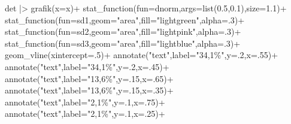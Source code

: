 \documentclass[
  letterpaper,
  DIV=11,
  numbers=noendperiod]{scrartcl}
\newenvironment{Shaded}{\begin{snugshade}}{\end{snugshade}}
\newcommand{\AttributeTok}[1]{\textcolor[rgb]{0.40,0.45,0.13}{#1}}
\newcommand{\DecValTok}[1]{\textcolor[rgb]{0.68,0.00,0.00}{#1}}
\newcommand{\FloatTok}[1]{\textcolor[rgb]{0.68,0.00,0.00}{#1}}
\newcommand{\FunctionTok}[1]{\textcolor[rgb]{0.28,0.35,0.67}{#1}}
\newcommand{\NormalTok}[1]{\textcolor[rgb]{0.00,0.23,0.31}{#1}}
\newcommand{\SpecialCharTok}[1]{\textcolor[rgb]{0.37,0.37,0.37}{#1}}
\newcommand{\StringTok}[1]{\textcolor[rgb]{0.13,0.47,0.30}{#1}}
\begin{document}
\begin{Shaded}
\begin{Highlighting}[]
\NormalTok{det }\SpecialCharTok{|\textgreater{}}
  \FunctionTok{grafik}\NormalTok{(}\AttributeTok{x=}\NormalTok{x)}\SpecialCharTok{+}
  \FunctionTok{stat\_function}\NormalTok{(}\AttributeTok{fun=}\NormalTok{dnorm,}\AttributeTok{args=}\FunctionTok{list}\NormalTok{(}\FloatTok{0.5}\NormalTok{,}\FloatTok{0.1}\NormalTok{),}\AttributeTok{size=}\FloatTok{1.1}\NormalTok{)}\SpecialCharTok{+}
  \FunctionTok{stat\_function}\NormalTok{(}\AttributeTok{fun=}\NormalTok{sd1,}\AttributeTok{geom=}\StringTok{"area"}\NormalTok{,}\AttributeTok{fill=}\StringTok{"lightgreen"}\NormalTok{,}\AttributeTok{alpha=}\NormalTok{.}\DecValTok{3}\NormalTok{)}\SpecialCharTok{+}
  \FunctionTok{stat\_function}\NormalTok{(}\AttributeTok{fun=}\NormalTok{sd2,}\AttributeTok{geom=}\StringTok{"area"}\NormalTok{,}\AttributeTok{fill=}\StringTok{"lightpink"}\NormalTok{,}\AttributeTok{alpha=}\NormalTok{.}\DecValTok{3}\NormalTok{)}\SpecialCharTok{+}
  \FunctionTok{stat\_function}\NormalTok{(}\AttributeTok{fun=}\NormalTok{sd3,}\AttributeTok{geom=}\StringTok{"area"}\NormalTok{,}\AttributeTok{fill=}\StringTok{"lightblue"}\NormalTok{,}\AttributeTok{alpha=}\NormalTok{.}\DecValTok{3}\NormalTok{)}\SpecialCharTok{+}
  \FunctionTok{geom\_vline}\NormalTok{(}\AttributeTok{xintercept=}\NormalTok{.}\DecValTok{5}\NormalTok{)}\SpecialCharTok{+}
  \FunctionTok{annotate}\NormalTok{(}\StringTok{"text"}\NormalTok{,}\AttributeTok{label=}\StringTok{"34,1\%"}\NormalTok{,}\AttributeTok{y=}\NormalTok{.}\DecValTok{2}\NormalTok{,}\AttributeTok{x=}\NormalTok{.}\DecValTok{55}\NormalTok{)}\SpecialCharTok{+}
  \FunctionTok{annotate}\NormalTok{(}\StringTok{"text"}\NormalTok{,}\AttributeTok{label=}\StringTok{"34,1\%"}\NormalTok{,}\AttributeTok{y=}\NormalTok{.}\DecValTok{2}\NormalTok{,}\AttributeTok{x=}\NormalTok{.}\DecValTok{45}\NormalTok{)}\SpecialCharTok{+}
  \FunctionTok{annotate}\NormalTok{(}\StringTok{"text"}\NormalTok{,}\AttributeTok{label=}\StringTok{"13,6\%"}\NormalTok{,}\AttributeTok{y=}\NormalTok{.}\DecValTok{15}\NormalTok{,}\AttributeTok{x=}\NormalTok{.}\DecValTok{65}\NormalTok{)}\SpecialCharTok{+}
  \FunctionTok{annotate}\NormalTok{(}\StringTok{"text"}\NormalTok{,}\AttributeTok{label=}\StringTok{"13,6\%"}\NormalTok{,}\AttributeTok{y=}\NormalTok{.}\DecValTok{15}\NormalTok{,}\AttributeTok{x=}\NormalTok{.}\DecValTok{35}\NormalTok{)}\SpecialCharTok{+}
  \FunctionTok{annotate}\NormalTok{(}\StringTok{"text"}\NormalTok{,}\AttributeTok{label=}\StringTok{"2,1\%"}\NormalTok{,}\AttributeTok{y=}\NormalTok{.}\DecValTok{1}\NormalTok{,}\AttributeTok{x=}\NormalTok{.}\DecValTok{75}\NormalTok{)}\SpecialCharTok{+}
  \FunctionTok{annotate}\NormalTok{(}\StringTok{"text"}\NormalTok{,}\AttributeTok{label=}\StringTok{"2,1\%"}\NormalTok{,}\AttributeTok{y=}\NormalTok{.}\DecValTok{1}\NormalTok{,}\AttributeTok{x=}\NormalTok{.}\DecValTok{25}\NormalTok{)}\SpecialCharTok{+}

\end{Highlighting}
\end{Shaded}
\end{document}
